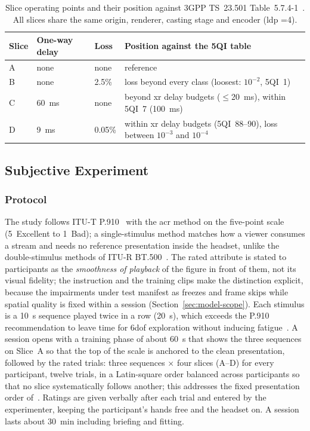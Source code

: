 \begin{table}[t]
  \caption{Slice operating points and their position against 3GPP
  TS~23.501 Table~5.7.4-1~\cite{3gpp23501}. All slices share the same
  origin, renderer, casting stage and encoder (\gls{ldp} \gof{}=4).}
  \label{tab:impairments}
  \centering
  \small
  \begin{tabular}{@{}llll@{}}
    \toprule
    Slice & One-way delay & Loss & Position against the 5QI table \\
    \midrule
    A & none                    & none   & reference \\
    B & none                    & 2.5\%  & loss beyond every class (loosest: $10^{-2}$, 5QI~1) \\
    C & \SI{60}{\milli\second}  & none   & beyond \gls{xr} delay budgets ($\le$\SI{20}{\milli\second}), within 5QI~7 (\SI{100}{\milli\second}) \\
    D & \SI{9}{\milli\second}   & 0.05\% & within \gls{xr} delay budgets (5QI~88--90), loss between $10^{-3}$ and $10^{-4}$ \\
    \bottomrule
  \end{tabular}
\end{table}

\subsection{Subjective Experiment}
\label{sec:method}

\subsubsection{Protocol}
The study follows ITU-T P.910~\cite{p910} with the \gls{acr} method on
the five-point scale (5~Excellent to 1~Bad); a single-stimulus method
matches how a viewer consumes a stream and needs no reference
presentation inside the headset, unlike the double-stimulus methods of
ITU-R BT.500~\cite{bt500}. The rated attribute is
stated to participants as the \emph{smoothness of playback} of the
figure in front of them, not its visual fidelity; the instruction and
the training clips make the distinction explicit, because the
impairments under test manifest as freezes and frame skips while
spatial quality is fixed within a session
(Section~\ref{sec:model-scope}). Each stimulus is a
\SI{10}{\second} sequence played twice in a row (\SI{20}{\second}),
which exceeds the P.910 recommendation to leave time for \gls{6dof}
exploration without inducing fatigue~\cite{mosaic2026}. A session
opens with a training phase of about \SI{60}{\second} that shows the
three sequences on Slice~A so that the top of the scale is anchored
to the clean presentation, followed by the rated trials: three
sequences $\times$ four slices (A--D) for every participant, twelve
trials, in a Latin-square order balanced across participants
so that no slice systematically follows another; this addresses the
fixed presentation order of~\cite{mosaic2026}. Ratings are given
verbally after each trial and entered by the experimenter, keeping
the participant's hands free and the headset on. A session lasts
about \SI{30}{\minute} including briefing and fitting.

